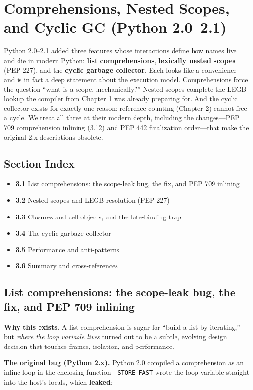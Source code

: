 \chapter{Comprehensions, Nested Scopes, and Cyclic GC (Python 2.0--2.1)}

Python 2.0--2.1 added three features whose interactions define how names live and die in
modern Python: \textbf{list comprehensions}, \textbf{lexically nested scopes} (PEP 227), and
the \textbf{cyclic garbage collector}. Each looks like a convenience and is in fact a deep
statement about the execution model. Comprehensions force the question ``what is a scope,
mechanically?'' Nested scopes complete the LEGB lookup the compiler from Chapter 1 was
already preparing for. And the cyclic collector exists for exactly one reason: reference
counting (Chapter 2) cannot free a cycle. We treat all three at their modern depth, including
the changes---PEP 709 comprehension inlining (3.12) and PEP 442 finalization order---that make
the original 2.x descriptions obsolete.

\section*{Section Index}
\begin{itemize}
  \item \textbf{3.1} List comprehensions: the scope-leak bug, the fix, and PEP 709 inlining
  \item \textbf{3.2} Nested scopes and LEGB resolution (PEP 227)
  \item \textbf{3.3} Closures and cell objects, and the late-binding trap
  \item \textbf{3.4} The cyclic garbage collector
  \item \textbf{3.5} Performance and anti-patterns
  \item \textbf{3.6} Summary and cross-references
\end{itemize}

\section{List comprehensions: the scope-leak bug, the fix, and PEP 709 inlining}

\textbf{Why this exists.} A list comprehension is sugar for ``build a list by iterating,'' but
\emph{where the loop variable lives} turned out to be a subtle, evolving design decision that
touches frames, isolation, and performance.

\textbf{The original bug (Python 2.x).} Python 2.0 compiled a comprehension as an inline loop
in the enclosing function---\texttt{STORE\_FAST} wrote the loop variable straight into the
host's locals, which \textbf{leaked}:

